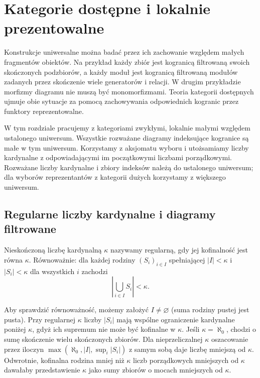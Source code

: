 \section{Kategorie dostępne i lokalnie prezentowalne}\label{cat:sec:accessible-presentable}

Konstrukcje uniwersalne można badać przez ich zachowanie względem małych fragmentów obiektów. Na przykład każdy zbiór jest kogranicą filtrowaną swoich skończonych podzbiorów, a każdy moduł jest kogranicą filtrowaną modułów zadanych przez skończenie wiele generatorów i relacji. W drugim przykładzie morfizmy diagramu nie muszą być monomorfizmami. Teoria kategorii dostępnych ujmuje obie sytuacje za pomocą zachowywania odpowiednich kogranic przez funktory reprezentowalne.

W tym rozdziale pracujemy z kategoriami zwykłymi, lokalnie małymi względem ustalonego uniwersum. Wszystkie rozważane diagramy indeksujące kogranice są małe w tym uniwersum. Korzystamy z aksjomatu wyboru i utożsamiamy liczby kardynalne z odpowiadającymi im początkowymi liczbami porządkowymi. Rozważane liczby kardynalne i zbiory indeksów należą do ustalonego uniwersum; dla wyborów reprezentantów z kategorii dużych korzystamy z większego uniwersum.

\subsection{Regularne liczby kardynalne i diagramy filtrowane}

\begin{definicja}[Regularność]\label{cat:def:accessible-regular}
Nieskończoną liczbę kardynalną $\kappa$ nazywamy regularną, gdy jej kofinalność jest równa $\kappa$. Równoważnie: dla każdej rodziny $(S_i)_{i\in I}$ spełniającej $|I|<\kappa$ i $|S_i|<\kappa$ dla wszystkich $i$ zachodzi
\[
 \left|\bigcup_{i\in I}S_i\right|<\kappa.
\]
\end{definicja}
Aby sprawdzić równoważność, możemy założyć $I\ne\varnothing$ (suma rodziny pustej jest pusta). Przy regularnej $\kappa$ liczby $|S_i|$ mają wspólne ograniczenie kardynalne poniżej $\kappa$, gdyż ich supremum nie może być kofinalne w $\kappa$. Jeśli $\kappa=\aleph_0$, chodzi o sumę skończenie wielu skończonych zbiorów. Dla nieprzeliczalnej $\kappa$ oszacowanie przez iloczyn $\max(\aleph_0,|I|,\sup_i|S_i|)$ z samym sobą daje liczbę mniejszą od $\kappa$. Odwrotnie, kofinalna rodzina mniej niż $\kappa$ liczb porządkowych mniejszych od $\kappa$ dawałaby przedstawienie $\kappa$ jako sumy zbiorów o mocach mniejszych od $\kappa$.

